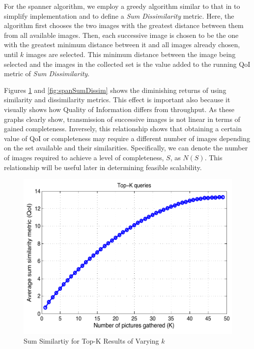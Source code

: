 For the spanner algorithm, we employ a greedy algorithm similar to that in \cite{mediascope} to simplify implementation and to define a \emph{Sum Dissimilarity} metric.  Here, the algorithm first chooses the two images with the greatest distance between them from all available images.  Then, each successive image is chosen to be the one with the greatest minimum distance between it and all images already chosen, until $k$ images are selected.  This minimum distance between the image being selected and the images in the collected set is the value added to the running QoI metric of \emph{Sum Dissimilarity}.

Figures \ref{fig:topkSumSim} and \ref{fig:spanSumDissim} shows the diminishing returns of using similarity and dissimilarity metrics.  This effect is important also because it visually shows how Quality of Information differs from throughput.  As these graphs clearly show, transmission of successive images is not linear in terms of gained completeness.  Inversely, this relationship shows that obtaining a certain value of QoI or completeness may require a different number of images depending on the set available and their similarities.  Specifically, we can denote the number of images required to achieve a level of completeness, $S$, as $N(S)$.  This relationship will be useful later in determining feasible scalability.

\begin{figure} 
\begin{centering}
    \includegraphics[scale=0.45]{figures/topkSumSimilarity.pdf}
    \caption{Sum Similartiy for Top-K Results of Varying $k$}
    \label{fig:topkSumSim}
\end{centering}
\end{figure}

